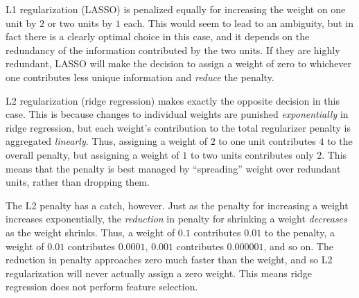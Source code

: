 

L1 regularization (LASSO) is penalized equally for increasing the weight on one unit by $2$ or two units by $1$ each. This would seem to lead to an ambiguity, but in fact there is a clearly optimal choice in this case, and it depends on the redundancy of the information contributed by the two units. If they are highly redundant, LASSO will make the decision to assign a weight of zero to whichever one contributes less unique information and {\em reduce} the penalty.

L2 regularization (ridge regression) makes exactly the opposite decision in this case. This is because changes to individual weights are punished {\em exponentially} in ridge regression, but each weight's contribution to the total regularizer penalty is aggregated {\em linearly}. Thus, assigning a weight of $2$ to one unit contributes $4$ to the overall penalty, but assigning a weight of $1$ to two units contributes only $2$. This means that the penalty is best managed by ``spreading'' weight over redundant units, rather than dropping them.

The L2 penalty has a catch, however. Just as the penalty for increasing a weight increases exponentially, the {\em reduction} in penalty for shrinking a weight {\em decreases} as the weight shrinks. Thus, a weight of $0.1$ contributes $0.01$ to the penalty, a weight of $0.01$ contributes $0.0001$, $0.001$ contributes $0.000001$, and so on. The reduction in penalty approaches zero much faster than the weight, and so L2 regularization will never actually assign a zero weight. This means ridge regression does not perform feature selection.

